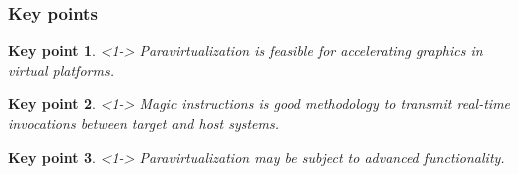 
\newtheorem{thm}{Key point}

\begin{frame}
\frametitle{Key points}

\begin{thm}<1->
Paravirtualization is feasible for accelerating graphics in virtual platforms.
\end{thm}

\begin{thm}<1->
Magic instructions is good methodology to transmit real-time invocations between target and host systems.
\end{thm}

\begin{thm}<1->
Paravirtualization may be subject to advanced functionality.
\end{thm}

\end{frame}